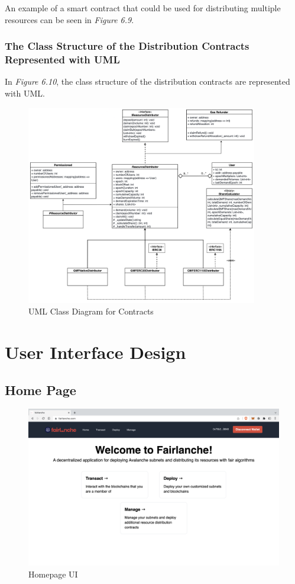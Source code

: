 \documentclass[a4paper,12pt]{report}
\begin{document}
An example of a smart contract that could be used for distributing multiple resources can be seen in \textit{Figure 6.9}.

\subsubsection{The Class Structure of the Distribution Contracts Represented with UML}
In \textit{Figure 6.10}, the class structure of the distribution contracts are represented with UML.
\begin{figure}[H]
	\centering
	\includegraphics[width=0.9\textwidth]{class2.png}
	\caption{UML Class Diagram for Contracts}
\end{figure}

\section{User Interface Design}
\subsection{Home Page}
\begin{figure}[H]
	\centering
	\includegraphics[width=1\textwidth]{ss1.png}
	\caption{Homepage UI}
\end{figure}
\end{document}
